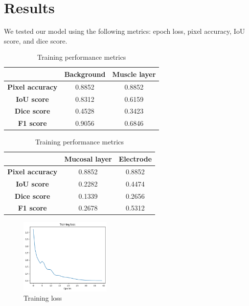 \section{Results}
\label{sec:results}

We tested our model using the following metrics: epoch loss, pixel accuracy, IoU score, and dice score.

\begin{table}[htbp]
    \centering
    \caption{Training performance metrics}
    \label{tab:example}

    \begin{tabular}{|c|c|c|}
        \hline
        & \textbf{Background} & \textbf{Muscle layer} \\
        \hline
        \textbf{Pixel accuracy} & 0.8852 & 0.8852 \\
        \textbf{IoU score} & 0.8312 & 0.6159 \\
        \textbf{Dice score} & 0.4528 & 0.3423 \\
        \textbf{F1 score} & 0.9056 & 0.6846 \\
        \hline
    \end{tabular}

    \begin{tabular}{|c|c|c|}
        \hline
        & \textbf{Mucosal layer} & \textbf{Electrode} \\
        \hline
        \textbf{Pixel accuracy} & 0.8852 & 0.8852 \\
        \textbf{IoU score} & 0.2282 & 0.4474 \\
        \textbf{Dice score} & 0.1339 & 0.2656 \\
        \textbf{F1 score} & 0.2678 & 0.5312 \\
        \hline
    \end{tabular}

\end{table}

\begin{figure}[htp!]
    \centering
    \includegraphics[width=0.4\textwidth]{Images/loss.png}
    \caption{Training loss}
    \label{fig:loss}
\end{figure}

